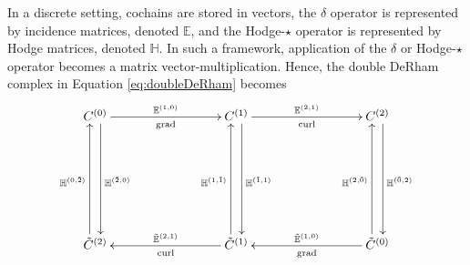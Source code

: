 In a discrete setting, cochains are stored in vectors, the $\delta$ operator is represented by incidence matrices, denoted $\mathbb{E}$, and the Hodge-$\star$ operator is represented by Hodge matrices, denoted $\mathbb{H}$. In such a framework, application of the $\delta$ or Hodge-$\star$ operator becomes a matrix vector-multiplication. Hence, the double DeRham complex in Equation \eqref{eq:doubleDeRham} becomes
\begin{equation}
    \begin{gathered}
        \xymatrix@=20ex{
            C^{(0)} \ar[r]^{\mathbb{E}^{(1,0)}}_{\text{grad}} \ar@<1ex>[d]^{\mathbb{H}^{(\tilde{2},0)}} & C^{(1)} \ar[r]^{\mathbb{E}^{(2,1)}}_{\text{curl}} \ar@<1ex>[d]^{\mathbb{H}^{(\tilde{1},1)}} & C^{(2)} \ar@<1ex>[d]^{\mathbb{H}^{(\tilde{0},2)}} \\
            \tilde{C}^{(2)} \ar@<1ex>[u]^{\mathbb{H}^{(0,\tilde{2})}} & \tilde{C}^{(1)} \ar[l]_{\tilde{\mathbb{E}}^{(2, 1)}}^{\text{curl}} \ar@<1ex>[u]^{\mathbb{H}^{(1,\tilde{1})}} & \tilde{C}^{(0)} \ar[l]_{\tilde{\mathbb{E}}^{(1,0)}}^{\text{grad}} \ar@<1ex>[u]^{\mathbb{H}^{(2,\tilde{0})}}
        }
    \end{gathered}
\end{equation}
